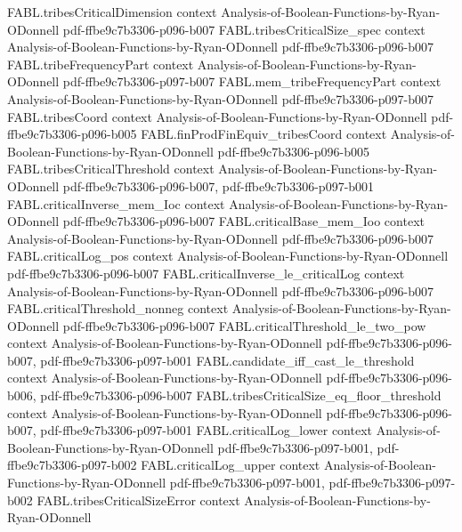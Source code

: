 \begin{theorem}
\proofstep
  {FABL.tribesCriticalDimension}
  {context}
  {Analysis-of-Boolean-Functions-by-Ryan-ODonnell}
  {pdf-ffbe9c7b3306-p096-b007}
\proofstep
  {FABL.tribesCriticalSize_spec}
  {context}
  {Analysis-of-Boolean-Functions-by-Ryan-ODonnell}
  {pdf-ffbe9c7b3306-p096-b007}
\proofstep
  {FABL.tribeFrequencyPart}
  {context}
  {Analysis-of-Boolean-Functions-by-Ryan-ODonnell}
  {pdf-ffbe9c7b3306-p097-b007}
\proofstep
  {FABL.mem_tribeFrequencyPart}
  {context}
  {Analysis-of-Boolean-Functions-by-Ryan-ODonnell}
  {pdf-ffbe9c7b3306-p097-b007}
\proofstep
  {FABL.tribesCoord}
  {context}
  {Analysis-of-Boolean-Functions-by-Ryan-ODonnell}
  {pdf-ffbe9c7b3306-p096-b005}
\proofstep
  {FABL.finProdFinEquiv_tribesCoord}
  {context}
  {Analysis-of-Boolean-Functions-by-Ryan-ODonnell}
  {pdf-ffbe9c7b3306-p096-b005}
\proofstep
  {FABL.tribesCriticalThreshold}
  {context}
  {Analysis-of-Boolean-Functions-by-Ryan-ODonnell}
  {pdf-ffbe9c7b3306-p096-b007,
    pdf-ffbe9c7b3306-p097-b001}
\proofstep
  {FABL.criticalInverse_mem_Ioc}
  {context}
  {Analysis-of-Boolean-Functions-by-Ryan-ODonnell}
  {pdf-ffbe9c7b3306-p096-b007}
\proofstep
  {FABL.criticalBase_mem_Ioo}
  {context}
  {Analysis-of-Boolean-Functions-by-Ryan-ODonnell}
  {pdf-ffbe9c7b3306-p096-b007}
\proofstep
  {FABL.criticalLog_pos}
  {context}
  {Analysis-of-Boolean-Functions-by-Ryan-ODonnell}
  {pdf-ffbe9c7b3306-p096-b007}
\proofstep
  {FABL.criticalInverse_le_criticalLog}
  {context}
  {Analysis-of-Boolean-Functions-by-Ryan-ODonnell}
  {pdf-ffbe9c7b3306-p096-b007}
\proofstep
  {FABL.criticalThreshold_nonneg}
  {context}
  {Analysis-of-Boolean-Functions-by-Ryan-ODonnell}
  {pdf-ffbe9c7b3306-p096-b007}
\proofstep
  {FABL.criticalThreshold_le_two_pow}
  {context}
  {Analysis-of-Boolean-Functions-by-Ryan-ODonnell}
  {pdf-ffbe9c7b3306-p096-b007,
    pdf-ffbe9c7b3306-p097-b001}
\proofstep
  {FABL.candidate_iff_cast_le_threshold}
  {context}
  {Analysis-of-Boolean-Functions-by-Ryan-ODonnell}
  {pdf-ffbe9c7b3306-p096-b006,
    pdf-ffbe9c7b3306-p096-b007}
\proofstep
  {FABL.tribesCriticalSize_eq_floor_threshold}
  {context}
  {Analysis-of-Boolean-Functions-by-Ryan-ODonnell}
  {pdf-ffbe9c7b3306-p096-b007,
    pdf-ffbe9c7b3306-p097-b001}
\proofstep
  {FABL.criticalLog_lower}
  {context}
  {Analysis-of-Boolean-Functions-by-Ryan-ODonnell}
  {pdf-ffbe9c7b3306-p097-b001,
    pdf-ffbe9c7b3306-p097-b002}
\proofstep
  {FABL.criticalLog_upper}
  {context}
  {Analysis-of-Boolean-Functions-by-Ryan-ODonnell}
  {pdf-ffbe9c7b3306-p097-b001,
    pdf-ffbe9c7b3306-p097-b002}
\proofstep
  {FABL.tribesCriticalSizeError}
  {context}
  {Analysis-of-Boolean-Functions-by-Ryan-ODonnell}

\end{theorem}
